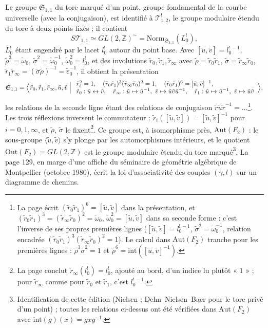 \documentclass[11pt,a4paper]{article}
\begin{document}
Le groupe $\mathfrak{S}_{1,1}$ du tore marqué d'un point, groupe fondamental de
la courbe universelle (avec la conjugaison), est identifié à
$\mathcal{T}^{!}_{1,2}$, le groupe modulaire étendu du tore à deux points
fixés ; il contient
\[
S\mathcal{T}_{1,1} \simeq GL(2, \mathbb{Z})^{\sim} = \mathrm{Norm}_{\mathfrak{S}_{1,1}}(L^!_0),
\]
$L^!_0$ étant engendré par le lacet $l^!_0$ autour du point base. Avec
$[\tilde u, \tilde v] = l_0^{!\,-1}$, $\tilde\rho^3 = \tilde\omega_0$,
$\tilde\sigma^2 = \tilde\omega_0^{-1}$, $\tilde\omega_0^2 = l^!_0$, et des
involutions $\tilde r_0, \tilde r_1, \tilde r_\infty$ avec
$\tilde\rho = \tilde r_0\tilde r_1$, $\tilde\sigma = \tilde r_\infty\tilde r_0$,
$\tilde r_1\tilde r_\infty = (\tilde\sigma\tilde\rho)^{-1} = \tilde\varepsilon_0^{-1}$,
il obtient la présentation
\[
\mathfrak{S}_{1,1} = \Bigl\langle \tilde r_0, \tilde r_1, \tilde r_\infty, \tilde u, \tilde v \Bigm|
\begin{array}{l}
\tilde r_i^2 = 1, \quad (\tilde r_0\tilde r_1)^3(\tilde r_\infty\tilde r_0)^2 = 1, \quad (\tilde r_0\tilde r_1)^6 = [\tilde u, \tilde v]^{-1}, \\
\tilde r_0 : \tilde u \leftrightarrow \tilde v, \quad
\tilde r_\infty : \tilde u \mapsto \tilde u^{-1},\ \tilde v \mapsto \tilde u\tilde v\tilde u^{-1}, \quad
\tilde r_1 : \tilde u \mapsto \tilde u^{-1},\ \tilde v \mapsto \tilde u\tilde v
\end{array}
\Bigr\rangle,
\]
les relations de la seconde ligne étant des relations de conjugaison
$\tilde r\tilde u\tilde r^{-1} = \ldots$\footnote{La page écrit
$(\tilde r_0\tilde r_1)^6 = [\tilde u, \tilde v]$ dans la présentation, et
$(\tilde r_0\tilde r_1)^3 = (\tilde r_\infty\tilde r_0)^2 = \tilde\omega_0$,
$\tilde\omega_0^2 = [\tilde u, \tilde v]$ dans sa seconde forme : c'est l'inverse
de ses propres premières lignes ($[\tilde u, \tilde v] = l_0^{!\,-1}$,
$\tilde\sigma^2 = \tilde\omega_0^{-1}$, relation encadrée
$(\tilde r_0\tilde r_1)^3(\tilde r_\infty\tilde r_0)^2 = 1$). Le calcul dans
$\mathrm{Aut}(F_2)$ tranche pour les premières lignes :
$\tilde\rho^3\tilde\sigma^2 = 1$ et $\tilde\rho^6 = \mathrm{int}([\tilde u, \tilde v]^{-1})$.}.
Les trois réflexions inversent le commutateur :
$\tilde r_i([\tilde u, \tilde v]) = [\tilde u, \tilde v]^{-1}$ pour
$i = 0, 1, \infty$, et $\tilde\rho$, $\tilde\sigma$ le fixent\footnote{La page
conclut $\tilde r_\infty(l^!_0) = l^!_0$, ajouté au bord, d'un indice lu
plutôt « $1$ » ; pour $\tilde r_\infty$ comme pour $\tilde r_0$ et $\tilde r_1$,
c'est $l_0^{!\,-1}$.}. Ce groupe est, à isomorphisme près, $\mathrm{Aut}(F_2)$ :
le sous-groupe $\langle \tilde u, \tilde v \rangle$ s'y plonge par les
automorphismes intérieurs, et le quotient
$\mathrm{Out}(F_2) = GL(2, \mathbb{Z})$ est le groupe modulaire étendu du tore
marqué\footnote{Identification de cette édition (Nielsen ; Dehn–Nielsen–Baer
pour le tore privé d'un point) ; toutes les relations ci-dessus ont été
vérifiées dans $\mathrm{Aut}(F_2)$ avec $\mathrm{int}(g)(x) = gxg^{-1}$.}. La
page 129, en marge d'une affiche du séminaire de géométrie algébrique de
Montpellier (octobre 1980), écrit la loi d'associativité des couples
$(\gamma, l)$ sur un diagramme de chemins.
\end{document}

